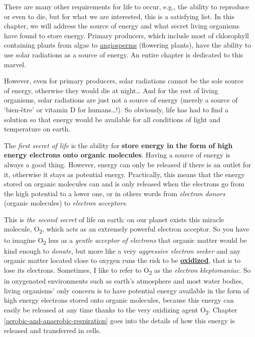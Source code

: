 \documentclass[]{book}
\theoremstyle{definition}
\theoremstyle{definition}
\theoremstyle{definition}
\theoremstyle{remark}
\begin{document}
There are many other requirements for life to occur, e.g., the ability
to reproduce or even to die, but for what we are interested, this is a
satisfying list. In this chapter, we will address the source of energy
and what secret living organisms have found to store energy. Primary
producers, which include most of chlorophyll containing plants from
algae to
\href{https://en.wikipedia.org/wiki/Flowering_plant}{angiosperms}
(flowering plants), have the ability to use solar radiations as a source
of energy. An entire chapter is dedicated to this marvel.

However, even for primary producers, solar radiations cannot be the sole
source of energy, otherwise they would die at night\ldots{} And for the
rest of living organisms, solar radiations are just not a source of
energy (merely a source of `bien-être' or vitamin D for
humans\ldots{}!). So obviously, life has had to find a solution so that
energy would be available for all conditions of light and temperature on
earth.

The \emph{first secret of life} is the ability for \textbf{store energy
in the form of high energy electrons onto organic molecules}. Having a
source of energy is always a good thing. However, energy can only be
released if there is an outlet for it, otherwise it stays as potential
energy. Practically, this means that the energy stored on organic
molecules can and is only released when the electrons go from the high
potential to a lower one, or in others words from \emph{electron donors}
(organic molecules) to \emph{electron acceptors}.

This is \emph{the second secret} of life on earth: on our planet exists
this miracle molecule, O\textsubscript{2}, which acts as an extremely
powerful electron acceptor. So you have to imagine O\textsubscript{2}
less as a \emph{gentle acceptor of electrons} that organic matter would
be kind enough to \emph{donate}, but more like a very \emph{aggressive
electron seeker} and any organic matter located close to oxygen runs the
risk to be \textbf{\protect\hyperlink{oxidation}{oxidized}}, that is to
lose its electrons. Sometimes, I like to refer to O\textsubscript{2} as
the \emph{electron kleptomaniac}. So in oxygenated environments such as
earth's atmosphere and most water bodies, living organisms' only concern
is to have potential energy available in the form of high energy
electrons stored onto organic molecules, because this energy can easily
be released at any time thanks to the very oxidizing agent
O\textsubscript{2}. Chapter \ref{aerobic-and-anaerobic-respiration} goes
into the details of how this energy is released and transferred in
cells.
\end{document}

